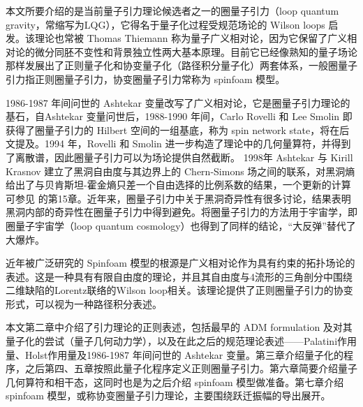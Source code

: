 	本文所要介绍的是当前量子引力理论候选者之一的圈量子引力（loop quantum gravity，常缩写为LQG），它得名于量子化过程受规范场论的 Wilson loops 启发。该理论也常被 Thomas Thiemann 称为量子广义相对论\cite{Thiemann2007}，因为它保留了广义相对论的微分同胚不变性和背景独立性两大基本原理。目前它已经像熟知的量子场论那样发展出了正则量子化和协变量子化（路径积分量子化）两套体系，一般圈量子引力指正则圈量子引力，协变圈量子引力常称为 spinfoam 模型。

	1986-1987 年间问世的 Ashtekar 变量改写了广义相对论，它是圈量子引力理论的基石，自Ashtekar 变量问世后，1988-1990 年间，Carlo Rovelli 和 Lee Smolin 即获得了圈量子引力的 Hilbert 空间的一组基底\cite{Rovelli1988,Rovelli1989}，称为 spin network state，将在后文提及。1994 年，Rovelli 和 Smolin 进一步构造了理论中的几何量算符，并得到了离散谱\cite{Rovelli1994}，因此圈量子引力可以为场论提供自然截断。 1998年 Ashtekar 与 Kirill Krasnov 建立了黑洞自由度与其边界上的 Chern-Simons 场之间的联系，对黑洞熵给出了与贝肯斯坦-霍金熵只差一个自由选择的比例系数的结果\cite{Ashtekar:1998ue}，一个更新的计算可参见\cite{Thiemann2007} 的第15章。近年来，圈量子引力中关于黑洞奇异性有很多讨论\cite{Ashtekar:2018lag,Ashtekar:2018cay,Ashtekar:2005qt,Bohmer:2007wi,Olmedo:2017lvt}，结果表明黑洞内部的奇异性在圈量子引力中得到避免。将圈量子引力的方法用于宇宙学，即圈量子宇宙学（loop quantum cosmology）也得到了同样的结论，“大反弹”替代了大爆炸\cite{Ashtekar:2011ni}。

	近年被广泛研究的 Spinfoam 模型的根源是广义相对论作为具有约束的拓扑场论的表述\cite{Bianchi2017}。这是一种具有有限自由度的理论，并且其自由度与4流形的三角剖分中围绕二维缺陷的Lorentz联络的Wilson loop相关。该理论提供了正则圈量子引力的协变形式，可以视为一种路径积分表述。
	
	本文第二章中介绍了引力理论的正则表述，包括最早的 ADM formulation 及对其量子化的尝试（量子几何动力学），以及在此之后的规范理论表述——Palatini作用量、Holst作用量及1986-1987 年间问世的 Ashtekar 变量。第三章介绍量子化的程序，之后第四、五章按照此量子化程序定义正则圈量子引力。第六章简要介绍量子几何算符和相干态，这同时也是为之后介绍 spinfoam 模型做准备。第七章介绍 spinfoam 模型，或称协变圈量子引力理论，主要围绕跃迁振幅的导出展开。%
